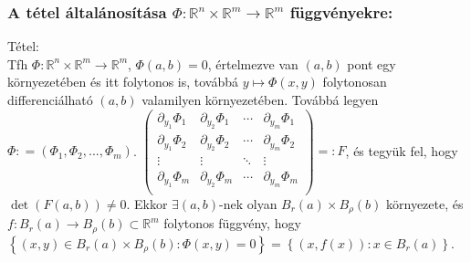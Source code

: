 \documentclass[12pt,a4paper]{scrartcl}
\newenvironment{tetel}{}{}
\newenvironment{bizonyitas}{}{}
\begin{document}
\begin{bizonyitas}
\end{bizonyitas}

\hypertarget{a-tetel-altalanositasa-left.-phimathbbrn-times-mathbbrmrightarrowmathbbrm-right.-fuggvenyekre}{%
\subsubsection{\texorpdfstring{A tétel általánosítása
\(\left. \Phi:{\mathbb{R}}^{n} \times {\mathbb{R}}^{m}\rightarrow{\mathbb{R}}^{m} \right.\)
függvényekre:}{A tétel általánosítása \textbackslash{}left. \textbackslash{}Phi:\{\textbackslash{}mathbb\{R\}\}\^{}\{n\} \textbackslash{}times \{\textbackslash{}mathbb\{R\}\}\^{}\{m\}\textbackslash{}rightarrow\{\textbackslash{}mathbb\{R\}\}\^{}\{m\} \textbackslash{}right. függvényekre:}}\label{a-tetel-altalanositasa-left.-phimathbbrn-times-mathbbrmrightarrowmathbbrm-right.-fuggvenyekre}}

\begin{tetel}

Tétel:\\
Tfh
\(\left. \Phi:{\mathbb{R}}^{n} \times {\mathbb{R}}^{m}\rightarrow{\mathbb{R}}^{m} \right.\),
\(\Phi\left( {a,b} \right) = 0\), értelmezve van
\(\left( {a,b} \right)\) pont egy környezetében és itt folytonos is,
továbbá \(\left. y\mapsto\Phi\left( {x,y} \right) \right.\) folytonosan
differenciálható \(\left( {a,b} \right)\) valamilyen környezetében.
Továbbá legyen
\(\Phi: = \left( {\Phi_{1},\Phi_{2},...,\Phi_{m}} \right)\).
\(\begin{pmatrix} {\partial_{y_{1}}\Phi_{1}} & {\partial_{y_{2}}\Phi_{1}} & \cdots & {\partial_{y_{m}}\Phi_{1}} \\ {\partial_{y_{1}}\Phi_{2}} & {\partial_{y_{2}}\Phi_{2}} & \cdots & {\partial_{y_{m}}\Phi_{2}} \\  \vdots & \vdots & \ddots & \vdots \\ {\partial_{y_{1}}\Phi_{m}} & {\partial_{y_{2}}\Phi_{m}} & \cdots & {\partial_{y_{m}}\Phi_{m}} \\ \end{pmatrix} = :F\),
és tegyük fel, hogy
\(\det\left( {F\left( {a,b} \right)} \right) \neq 0\). Ekkor
\(\exists\left( {a,b} \right)\)-nek olyan
\(B_{r}\left( a \right) \times B_{\rho}\left( b \right)\) környezete, és
\(\left. f:B_{r}\left( a \right)\rightarrow B_{\rho}\left( b \right) \subset {\mathbb{R}}^{m} \right.\)
folytonos függvény, hogy
\(\left\{ {\left( {x,y} \right) \in B_{r}\left( a \right) \times B_{\rho}\left( b \right):\Phi\left( {x,y} \right) = 0} \right\} = \left\{ {\left( {x,f\left( x \right)} \right):x \in B_{r}\left( a \right)} \right\}\).

\end{tetel}
\end{document}
